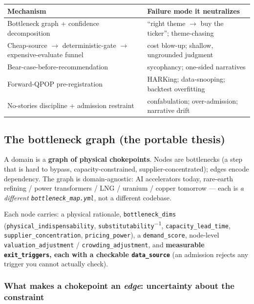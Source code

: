 \documentclass[11pt]{article}
\begin{document}
\begin{center}
\begin{tabularx}{\linewidth}{@{}LL@{}}
\toprule
\textbf{Mechanism} & \textbf{Failure mode it neutralizes} \\
\midrule
Bottleneck graph + confidence decomposition & ``right theme $\to$ buy the ticker''; theme-chasing \\
Cheap-source $\to$ deterministic-gate $\to$ expensive-evaluate funnel & cost blow-up; shallow, ungrounded judgment \\
Bear-case-before-recommendation & sycophancy; one-sided narratives \\
Forward-QPOP pre-registration & HARKing; data-snooping; backtest overfitting \\
No-stories discipline + admission restraint & confabulation; over-admission; narrative drift \\
\bottomrule
\end{tabularx}
\end{center}

\subsection{The bottleneck graph (the portable thesis)}

A domain is a \textbf{graph of physical chokepoints}. Nodes are bottlenecks (a step that is hard to
bypass, capacity-constrained, supplier-concentrated); edges encode dependency. The graph is
domain-agnostic: AI accelerators today, rare-earth refining / power transformers / LNG / uranium /
copper tomorrow --- each is \emph{a different \texttt{bottleneck\_map.yml}}, not a different codebase.

Each node carries: a physical rationale, \texttt{bottleneck\_dims}
(\texttt{physical\_indispensability}, \texttt{substitutability}\textsuperscript{$-1$},
\texttt{capacity\_lead\_time}, \texttt{supplier\_concentration}, \texttt{pricing\_power}), a
\texttt{demand\_score}, node-level \texttt{valuation\_adjustment} / \texttt{crowding\_adjustment},
and \textbf{measurable \texttt{exit\_triggers}, each with a checkable \texttt{data\_source}} (an
admission rejects any trigger you cannot actually check).

\subsubsection*{What makes a chokepoint an \emph{edge}: uncertainty about the constraint}
\end{document}
